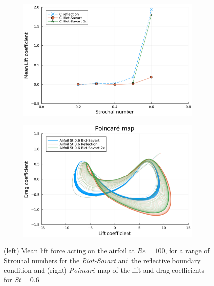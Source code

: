 \documentclass[preprint,12pt]{elsarticle}
\begin{document}
\begin{figure}
    \centering
    \begin{subfigure}{.5\textwidth}
        \centering
        \includegraphics[trim={0 0 0 0},clip,width=\textwidth]{tex/fig/CL_mean_deflected_wake.png}
    \end{subfigure}%
    \begin{subfigure}{.5\textwidth}
        \centering
        \includegraphics[trim={0 0 0 0},clip,width=\textwidth]{tex/fig/poincare_deflected_wake.png}
    \end{subfigure}
    \caption{(left) Mean lift force acting on the airfoil at $Re=100$, for a range of Strouhal numbers for the \emph{Biot-Savart} and the reflective boundary condition  and (right) \emph{Poincar\'e} map of the lift and drag coefficients for $St=0.6$}
    \label{fig:deflected_wake_2}
\end{figure}
\end{document}
